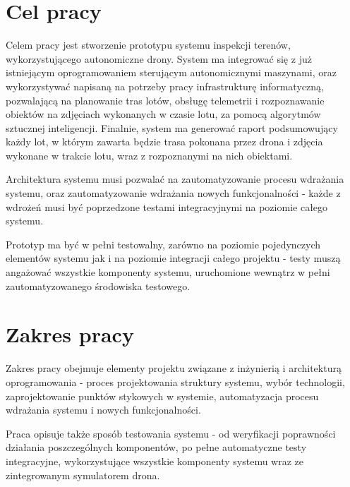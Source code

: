
\newpage
\section{Cel pracy}

Celem pracy jest stworzenie prototypu systemu inspekcji terenów, wykorzystującego
autonomiczne drony. System ma integrować się z już istniejącym oprogramowaniem
sterującym autonomicznymi maszynami, oraz wykorzystywać napisaną na potrzeby pracy
infrastrukturę informatyczną, pozwalającą na planowanie tras lotów, obsługę telemetrii
i rozpoznawanie obiektów na zdjęciach wykonanych w czasie lotu, za pomocą algorytmów
sztucznej inteligencji. Finalnie, system ma generować raport podsumowujący każdy lot,
w którym zawarta będzie trasa pokonana przez drona i zdjęcia wykonane w trakcie lotu,
wraz z rozpoznanymi na nich obiektami. 

Architektura systemu musi pozwalać na zautomatyzowanie procesu wdrażania
systemu, oraz zautomatyzowanie wdrażania nowych funkcjonalności - każde
z wdrożeń musi być poprzedzone testami integracyjnymi na poziomie całego systemu. 

Prototyp ma być w pełni testowalny, zarówno na poziomie pojedynczych
elementów systemu jak i na poziomie integracji całego projektu - testy muszą
angażować wszystkie komponenty systemu, uruchomione wewnątrz w pełni
zautomatyzowanego środowiska testowego.

\section{Zakres pracy}

Zakres pracy obejmuje elementy projektu związane z
inżynierią i architekturą oprogramowania - proces projektowania struktury systemu,
wybór technologii, zaprojektowanie punktów stykowych w systemie, automatyzacja
procesu wdrażania systemu i nowych funkcjonalności.

Praca opisuje także sposób testowania systemu - od weryfikacji poprawności działania
poszczególnych komponentów, po pełne automatyczne testy integracyjne, wykorzystujące 
wszystkie komponenty systemu wraz ze zintegrowanym symulatorem drona. 

